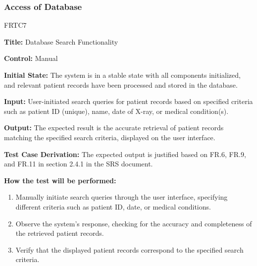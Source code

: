 \documentclass[12pt, titlepage]{article}
\begin{document}
\subsubsection{Access of Database}
\begin{itemize}
    \begin{item}
        FRTC7
        \begin{mdframed}[linewidth=0.5mm]
            \textbf{Title:} Database Search Functionality \par
            \textbf{Control:} Manual \par
            \textbf{Initial State:} The system is in a stable state with all components initialized, and relevant patient records have been processed and stored in the database. \par
            \textbf{Input:} User-initiated search queries for patient records based on specified criteria such as patient ID (unique), name, date of X-ray, or medical condition(s). \par
            \textbf{Output:} The expected result is the accurate retrieval of patient records matching the specified search criteria, displayed on the user interface. \par
            \textbf{Test Case Derivation:} The expected output is justified based on FR.6, FR.9, and FR.11 in section 2.4.1 in the SRS document. \par
            \textbf{How the test will be performed:}
            \begin{enumerate}[noitemsep]
                \item Manually initiate search queries through the user interface, specifying different criteria such as patient ID, date, or medical conditions.
                \item Observe the system's response, checking for the accuracy and completeness of the retrieved patient records.
                \item Verify that the displayed patient records correspond to the specified search criteria.
            \end{enumerate}
        \end{mdframed}
    \end{item}
\end{itemize}
\end{document}
